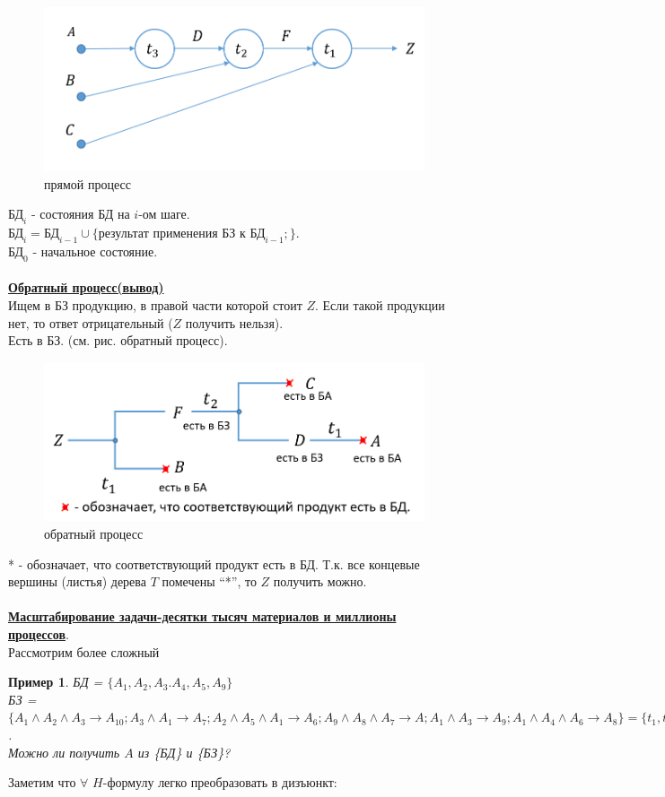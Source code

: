 \documentclass{article}
\newtheorem{example}{Пример}
\numberwithin{example}{section}
\numberwithin{question}{section}
\numberwithin{Remark}{section}
\numberwithin{theorem}{section}
\numberwithin{definition}{section}
\numberwithin{proposition}{section}
\begin{document}
\begin{figure}[!htp]
	\centering
	\includegraphics[width=0.3\linewidth]{10-3}
	\caption{прямой процесс}
	\label{fig:10-3}
\end{figure}
$\text{БД}_i$ - состояния БД на $i$-ом шаге.\\
$\text{БД}_i=\text{БД}_{i-1}\cup \{\text{результат применения БЗ к БД}_{i-1};\}$.\\
$\text{БД}_0$ - начальное состояние.\\
\\
\underline{\textbf{Обратный процесс(вывод)}}\\
Ищем в БЗ продукцию, в правой части которой стоит $Z$. Если такой продукции нет, то ответ отрицательный ($Z$ получить нельзя).\\
Есть в БЗ. (см. рис. обратный процесс).\quad 
\begin{figure}[!htp]
	\centering
	\includegraphics[width=0.5\linewidth]{10-4}
	\caption{обратный процесс}
	\label{fig:10-4}
\end{figure}
* - обозначает, что соответствующий продукт есть в БД. Т.к. все концевые вершины (листья) дерева $T$ помечены ``*'', то $Z$ получить можно.\\
\\
\underline{\textbf{Масштабирование задачи-десятки тысяч материалов и миллионы процессов}}.\\
Рассмотрим более сложный
\begin{example}
	БД = $\{A_1,A_2,A_3.A_4,A_5,A_9 \}$\\
	БЗ = $\{A_1\wedge A_2\wedge A_3\to A_{10};A_3\wedge A_1\to A_7;A_2\wedge A_5\wedge A_1\to A_6; A_9\wedge A_8\wedge A_7\to A;A_1\wedge A_3\to A_9;A_1\wedge A_4\wedge A_6\to A_8\}=\{t_1,t_2,t_3,t_4,t_5,t_6 \}$.\\
	Можно ли получить $A$ из \{БД\} и \{БЗ\}?
\end{example}
Заметим что $\forall$ $H$-формулу легко преобразовать в дизъюнкт:\\
\end{document}
